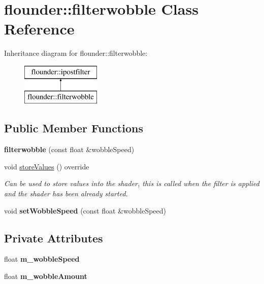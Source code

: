 \hypertarget{classflounder_1_1filterwobble}{}\section{flounder\+:\+:filterwobble Class Reference}
\label{classflounder_1_1filterwobble}
Inheritance diagram for flounder\+:\+:filterwobble\+:\begin{figure}[H]
\begin{center}
\leavevmode
\includegraphics[height=2.000000cm]{classflounder_1_1filterwobble}
\end{center}
\end{figure}
\subsection*{Public Member Functions}
\begin{DoxyCompactItemize}
\item 
\mbox{\label{classflounder_1_1filterwobble_a1652b7755d6405c677bfa8ce59dbb1ea}} 
{\bfseries filterwobble} (const float \&wobble\+Speed)
\item 
void \hyperlink{classflounder_1_1filterwobble_aa89ed7a9f3ad52790223b558aaff0cc4}{store\+Values} () override
\begin{DoxyCompactList}\small\item\em Can be used to store values into the shader, this is called when the filter is applied and the shader has been already started. \end{DoxyCompactList}\item 
\mbox{\label{classflounder_1_1filterwobble_a4d1c42d560002f4deaab0f59766e191e}} 
void {\bfseries set\+Wobble\+Speed} (const float \&wobble\+Speed)
\end{DoxyCompactItemize}
\subsection*{Private Attributes}
\begin{DoxyCompactItemize}
\item 
\mbox{\label{classflounder_1_1filterwobble_ac10ce8e0eda476dcaae1a5ff9d838171}} 
float {\bfseries m\+\_\+wobble\+Speed}
\item 
\mbox{\label{classflounder_1_1filterwobble_a7680465eea629d117dc88c0eec11a5bd}} 
float {\bfseries m\+\_\+wobble\+Amount}
\end{DoxyCompactItemize}

